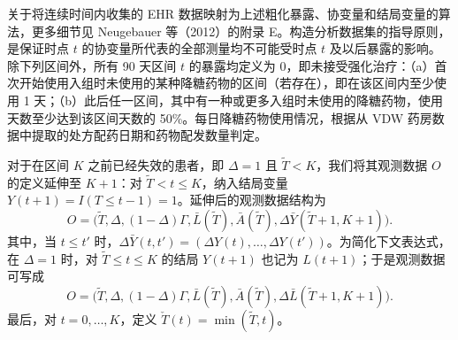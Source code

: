 关于将连续时间内收集的 EHR 数据映射为上述粗化暴露、协变量和结局变量的算法，更多细节见 Neugebauer 等（2012）的附录 E。构造分析数据集的指导原则，是保证时点 $t$ 的协变量所代表的全部测量均不可能受时点 $t$ 及以后暴露的影响。除下列区间外，所有 90 天区间 $t$ 的暴露均定义为 0，即未接受强化治疗：（a）首次开始使用入组时未使用的某种降糖药物的区间（若存在），即在该区间内至少使用 1 天；（b）此后任一区间，其中有一种或更多入组时未使用的降糖药物，使用天数至少达到该区间天数的 50\%。每日降糖药物使用情况，根据从 VDW 药房数据中提取的处方配药日期和药物配发数量判定。

对于在区间 $K$ 之前已经失效的患者，即 $\Delta=1$ 且 $\widetilde T<K$，我们将其观测数据 $O$ 的定义延伸至 $K+1$：对 $\widetilde T<t\leq K$，纳入结局变量 $Y(t+1)=I(T\leq t-1)=1$。延伸后的观测数据结构为
\begin{equation}
 O=\bigl(\widetilde T,\Delta,(1-\Delta)\Gamma,\bar L(\widetilde T),
 \bar A(\widetilde T),\Delta\bar Y(\widetilde T+1,K+1)\bigr).
 \tag{16.1}
\end{equation}
其中，当 $t\leq t'$ 时，$\Delta\bar Y(t,t')=(\Delta Y(t),\ldots,\Delta Y(t'))$。为简化下文表达式，在 $\Delta=1$ 时，对 $\widetilde T\leq t\leq K$ 的结局 $Y(t+1)$ 也记为 $L(t+1)$；于是观测数据可写成
\[
 O=\bigl(\widetilde T,\Delta,(1-\Delta)\Gamma,\bar L(\widetilde T),
 \bar A(\widetilde T),\Delta\bar L(\widetilde T+1,K+1)\bigr).
\]
最后，对 $t=0,\ldots,K$，定义 $\check T(t)=\min(\widetilde T,t)$。
